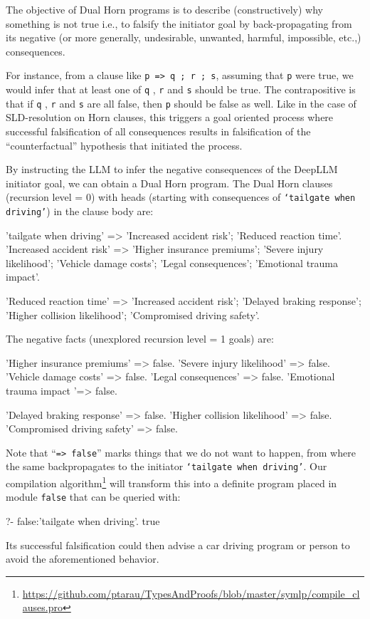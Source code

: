 \documentclass[submission,copyright,creativecommons]{eptcs}
\begin{document}
The objective of Dual Horn programs is to describe (constructively) why something is not true  i.e., to falsify the initiator goal
by back-propagating from its negative (or more generally, undesirable, unwanted, harmful, impossible, etc.,) consequences.

For instance, from a clause like \verb~p => q ; r ; s~, assuming that {\tt p} were true, we would infer that at least one of {\tt q} , {\tt r} and {\tt s} should be true. The contrapositive is that if  {\tt q} , {\tt r} and {\tt s} are all false, then {\tt p} should be false as well.
Like in the case of SLD-resolution on Horn clauses, this triggers a goal oriented process where successful falsification of all consequences results in falsification of the ``counterfactual'' hypothesis that initiated the process.

By instructing the LLM to infer the negative consequences of the DeepLLM initiator goal, we can obtain a Dual Horn program.
\BX  The Dual Horn clauses (recursion level = 0) with heads (starting with  consequences of {\tt `tailgate when driving'}) in the clause body are:

\begin{code}
'tailgate when driving' =>
    'Increased accident risk';
    'Reduced reaction time'.
'Increased accident risk' =>
    'Higher insurance premiums';
    'Severe injury likelihood';
    'Vehicle damage costs';
    'Legal consequences';
    'Emotional trauma impact'.
 \end{code}

 \begin{code}   
'Reduced reaction time' =>
    'Increased accident risk';
    'Delayed braking response';
    'Higher collision likelihood';
    'Compromised driving safety'.
\end{code}
The negative facts (unexplored recursion level = 1 goals) are:
\begin{code}
'Higher insurance premiums' => false.
'Severe injury likelihood' => false.
'Vehicle damage costs' => false.
'Legal consequences' => false.
'Emotional trauma impact '=> false.
\end{code}

 \begin{code} 
'Delayed braking response' => false.
'Higher collision likelihood' => false.
'Compromised driving safety' => false.
\end{code}
Note that ``\verb~=> false~'' marks things that we do not want to happen, from where the same backpropagates to the initiator {\tt `tailgate when driving'}.
Our compilation algorithm\footnote{\url{https://github.com/ptarau/TypesAndProofs/blob/master/symlp/compile_clauses.pro}} will transform this into a definite program placed in module {\tt false} that can be queried with:
\begin{codex}
?- false:'tailgate when driving'.
true
\end{codex}
\EX
Its successful falsification could then advise a car driving program or person to avoid the aforementioned  behavior.
\end{document}
